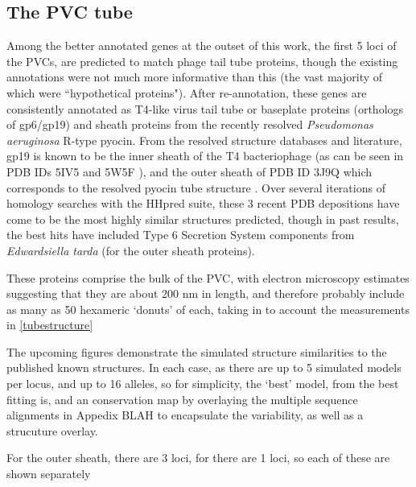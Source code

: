 \subsection{The PVC tube}
Among the better annotated genes at the outset of this work, the first 5 loci of the PVCs, are predicted to match phage tail tube proteins, though the existing annotations were not much more informative than this (the vast majority of which were ``hypothetical proteins"). After re-annotation, these genes are consistently annotated as T4-like virus tail tube or baseplate proteins (orthologs of gp6/gp19) and sheath proteins from the recently resolved \emph{Pseudomonas aeruginosa} R-type pyocin. From the resolved structure databases and literature, gp19 is known to be the inner sheath of the T4 bacteriophage (as can be seen in PDB IDs 5IV5 and 5W5F \citep{Taylor2016, Zheng2017}), and the outer sheath of PDB ID 3J9Q which corresponds to the resolved pyocin tube structure \citep{Ge2015a}. Over several iterations of homology searches with the HHpred suite, these 3 recent PDB depositions have come to be the most highly similar structures predicted, though in past results, the best hits have included Type 6 Secretion System components from \emph{Edwardsiella tarda} (for the outer sheath proteins).

These proteins comprise the bulk of the PVC, with electron microscopy estimates suggesting that they are about 200 nm in length, and therefore probably include as many as 50 hexameric `donuts' of each, taking in to account the measurements in \vref{tubestructure}


The upcoming figures demonstrate the simulated structure similarities to the published known structures. In each case, as there are up to 5 simulated models per locus, and up to 16 alleles, so for simplicity, the `best' model, from the best fitting is, and an conservation map by overlaying the multiple sequence alignments in Appedix BLAH  to encapsulate the variability, as well as a strucuture overlay.

For the outer sheath, there are 3 loci, for there are 1 loci, so each of these are shown separately









